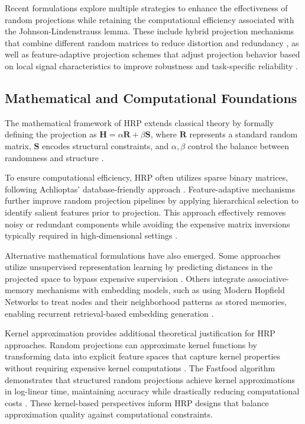 \documentclass[conference]{IEEEtran}
\begin{document}
Recent formulations explore multiple strategies to enhance the effectiveness of random projections while retaining the computational efficiency associated with the Johnson-Lindenstrauss lemma. These include hybrid projection mechanisms that combine different random matrices to reduce distortion and redundancy \cite{yahaya2025hrp}, as well as feature-adaptive projection schemes that adjust projection behavior based on local signal characteristics to improve robustness and task-specific reliability \cite{yang2021cancelable}.

\subsection{Mathematical and Computational Foundations}

The mathematical framework of HRP extends classical theory by formally defining the projection as $\mathbf{H} = \alpha \mathbf{R} + \beta \mathbf{S}$, where $\mathbf{R}$ represents a standard random matrix, $\mathbf{S}$ encodes structural constraints, and $\alpha, \beta$ control the balance between randomness and structure \cite{yahaya2025hrp}.

To ensure computational efficiency, HRP often utilizes sparse binary matrices, following Achlioptas' database-friendly approach \cite{achlioptas2003}. Feature-adaptive mechanisms further improve random projection pipelines by applying hierarchical selection to identify salient features prior to projection. This approach effectively removes noisy or redundant components while avoiding the expensive matrix inversions typically required in high-dimensional settings \cite{wang2019hierarchical}.

Alternative mathematical formulations have also emerged. Some approaches utilize unsupervised representation learning by predicting distances in the projected space to bypass expensive supervision \cite{wang2020unsupervised}. Others integrate associative-memory mechanisms with embedding models, such as using Modern Hopfield Networks to treat nodes and their neighborhood patterns as stored memories, enabling recurrent retrieval-based embedding generation \cite{le2022associative}.

Kernel approximation provides additional theoretical justification for HRP approaches. Random projections can approximate kernel functions by transforming data into explicit feature spaces that capture kernel properties without requiring expensive kernel computations \cite{blum2006}. The Fastfood algorithm demonstrates that structured random projections achieve kernel approximations in log-linear time, maintaining accuracy while drastically reducing computational costs \cite{le2014fastfood}. These kernel-based perspectives inform HRP designs that balance approximation quality against computational constraints.
\end{document}
